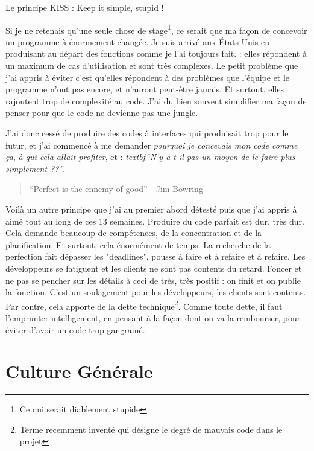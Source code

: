 \begin{center}Le principe KISS : Keep it simple, stupid !\end{center}

Si je ne retenais qu'une seule chose de stage\footnote{Ce qui serait diablement stupide}, ce serait que ma façon de concevoir un programme à énormement changée. Je suis arrivé aux États-Unis en produisant au départ des fonctions comme je l'ai toujours fait. : elles répondent à un maximum de cas d'utilisation et sont très complexes. Le petit problème que j'ai appris à éviter c'est qu'elles répondent à des problèmes que l'équipe et le programme n'ont pas encore, et n'auront peut-être jamais. Et surtout, elles rajoutent trop de complexité au code. J'ai du bien souvent simplifier ma façon de penser pour que le code ne devienne pas une jungle.

J'ai donc cessé de produire des codes à interfaces qui produisait trop pour le futur, et j'ai commencé à me demander \emph{pourquoi je concevais mon code comme ça}, \emph{à qui cela allait profiter}, et : \emph{textbf{``N'y a t-il pas un moyen de le faire plus simplement ??''}}.

\begin{quote}
``Perfect is the ennemy of good'' - Jim Bowring
\end{quote}

Voilà un autre principe que j'ai au premier abord détesté puis que j'ai appris à aimé tout au long de ces 13 semaines. Produire du code parfait est dur, très dur. Cela demande beaucoup de compétences, de la concentration et de la planification. Et surtout, cela énormément de temps. La recherche de la perfection fait dépasser les "deadlines", pousse à faire et à refaire et à refaire. Les développeurs se fatiguent et les clients ne sont pas contents du retard. Foncer et ne pas se pencher sur les détails à ceci de très, très positif : on finit et on publie la fonction. C'est un soulagement pour les développeurs, les clients sont contents. Par contre, cela apporte de la dette technique\footnote{Terme recemment inventé qui désigne le degré de mauvais code dans le projet}. Comme toute dette, il faut l'emprunter intelligement, en pensant à la façon dont on va la rembourser, pour éviter d'avoir un code trop gangrainé.

\section{Culture Générale}
